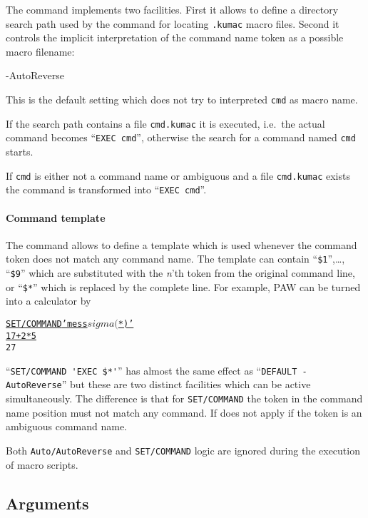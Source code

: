 The command  implements two facilities.
First it allows to define a directory search path used by the
 command for locating \texttt{.kumac} macro files.
Second it controls the implicit interpretation of the command name token as a
possible macro filename:
\begin{DLtt}{-AutoReverse}
\item[\texttt{-Command}]
This is the default setting which does not try to interpreted
\texttt{cmd} as macro name.
\item[\texttt{-Auto}]
If the search path contains a file \texttt{cmd.kumac} it is executed,
i.e.\ the actual command becomes ``\texttt{EXEC cmd}'', otherwise the
search for a command named \texttt{cmd} starts.
\item[\texttt{-AutoReverse}]
If \texttt{cmd} is either not a command name or ambiguous and a file
\texttt{cmd.kumac} exists the command is transformed into 
``\texttt{EXEC cmd}''.
\end{DLtt}


\paragraph{Command template\label{para-set-command}}

The command  allows to define a template which is
used whenever the command token does not match any command name.
The template can contain ``\verb!$1!'',\dots, ``\verb!$9!'' which are
substituted with the \textsl{n}'th token from the original command line,
or ``\verb!$*!'' which is replaced by the complete line.
For example, PAW can be turned into a calculator by
\begin{alltt}
\PROMPT{} \underline{SET/COMMAND 'mess $sigma($*)'}
\PROMPT{} \underline{17+2*5}
 27
\end{alltt}

``\verb!SET/COMMAND 'EXEC $*'!'' has almost the same effect as 
``\verb!DEFAULT -AutoReverse!'' but these are two distinct facilities
which can be active simultaneously.
The difference is that for \texttt{SET/COMMAND} the token in the command
name position must not match any command.
If does not apply if the token is an ambiguous command name.

Both \texttt{Auto/AutoReverse} and \texttt{SET/COMMAND} logic are ignored
during the execution of macro scripts.


%
%
\subsection{Arguments}


